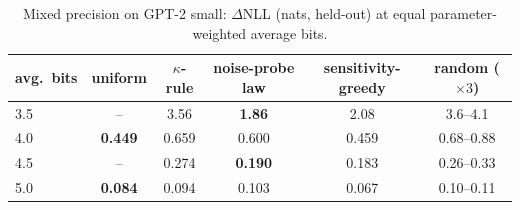 \documentclass{article}
\begin{document}
\begin{table}[h]\centering\small
\caption{Mixed precision on GPT-2 small: $\Delta$NLL (nats, held-out) at equal parameter-weighted average bits.}
\label{tab:mixed}
\begin{tabular}{lccccc}\toprule
avg.\ bits & uniform & $\kappa$-rule & noise-probe law & sensitivity-greedy & random ($\times3$)\\\midrule
3.5 & -- & 3.56 & \textbf{1.86} & 2.08 & 3.6--4.1\\
4.0 & \textbf{0.449} & 0.659 & 0.600 & 0.459 & 0.68--0.88\\
4.5 & -- & 0.274 & \textbf{0.190} & 0.183 & 0.26--0.33\\
5.0 & \textbf{0.084} & 0.094 & 0.103 & 0.067 & 0.10--0.11\\\bottomrule
\end{tabular}
\end{table}
\end{document}
